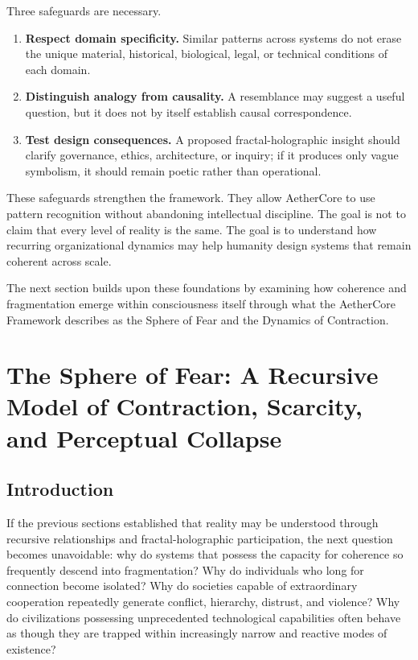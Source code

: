 \documentclass[12pt]{article}
\begin{document}
Three safeguards are necessary.

\begin{enumerate}
  \item \textbf{Respect domain specificity.} Similar patterns across systems do not erase the unique material, historical, biological, legal, or technical conditions of each domain.
  \item \textbf{Distinguish analogy from causality.} A resemblance may suggest a useful question, but it does not by itself establish causal correspondence.
  \item \textbf{Test design consequences.} A proposed fractal-holographic insight should clarify governance, ethics, architecture, or inquiry; if it produces only vague symbolism, it should remain poetic rather than operational.
\end{enumerate}

These safeguards strengthen the framework. They allow AetherCore to use pattern recognition without abandoning intellectual discipline. The goal is not to claim that every level of reality is the same. The goal is to understand how recurring organizational dynamics may help humanity design systems that remain coherent across scale.

The next section builds upon these foundations by examining how coherence and fragmentation emerge within consciousness itself through what the AetherCore Framework describes as the Sphere of Fear and the Dynamics of Contraction.

\section{The Sphere of Fear: A Recursive Model of Contraction, Scarcity, and Perceptual Collapse}

\subsection{Introduction}

If the previous sections established that reality may be understood through recursive relationships and fractal-holographic participation, the next question becomes unavoidable: why do systems that possess the capacity for coherence so frequently descend into fragmentation? Why do individuals who long for connection become isolated? Why do societies capable of extraordinary cooperation repeatedly generate conflict, hierarchy, distrust, and violence? Why do civilizations possessing unprecedented technological capabilities often behave as though they are trapped within increasingly narrow and reactive modes of existence?
\end{document}
